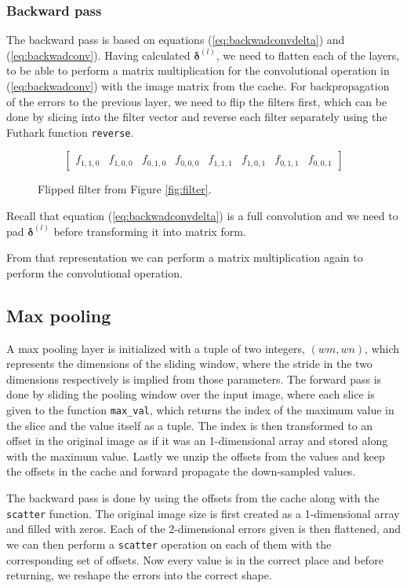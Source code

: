 \subsubsection{Backward pass}
The backward pass is based on equations (\ref{eq:backwadconvdelta}) and
(\ref{eq:backwadconv}). Having calculated $\boldsymbol{\delta}^{(l)}$, we need
to flatten each of the layers, to be able to perform a matrix multiplication for
the convolutional operation in (\ref{eq:backwadconv}) with the image matrix from
the cache.
For backpropagation of the errors to the previous layer, we need to flip the
filters first, which can be done by slicing into the filter vector and reverse
each filter separately using the Futhark function \texttt{reverse}. 
\begin{figure}[!hbtp]
	\begin{displaymath}
	\begin{bmatrix}
	f_{1,1,0} & f_{1,0,0} & f_{0,1,0} & f_{0,0,0} & f_{1,1,1} & f_{1,0,1} &
	f_{0,1,1} & f_{0,0,1}
	\end{bmatrix}
	\end{displaymath}
	\caption{Flipped filter from Figure \ref{fig:filter}.}
\end{figure} \newline 
Recall that equation (\ref{eq:backwadconvdelta}) is a full convolution and we
need to pad $\boldsymbol{\delta}^{(l)}$ before transforming it into matrix form.

From that representation we can perform a matrix multiplication again to perform
the convolutional operation.

\subsection{Max pooling}
A max pooling layer is initialized with a tuple of two integers, $(wm, wn)$,
which represents the dimensions of the sliding window, where the stride in the
two dimensions respectively is implied from those parameters. 
The forward pass is done by sliding the pooling window over the input image,
where each slice is given to the function \texttt{max\_val}, which returns the
index of the maximum value in the slice and the value itself as a tuple. 
The index is then transformed to an offset in the original image as if it was an
1-dimensional array and stored along with the maximum value. 
Lastly we unzip the offsets from the values and keep the offsets in the cache
and forward propagate the down-sampled values. 

The backward pass is done by using the offsets from the cache along with the
\texttt{scatter} function. 
The original image size is first created as a 1-dimensional array and filled
with zeros. 
Each of the 2-dimensional errors given is then flattened, and we can then
perform a \texttt{scatter} operation on each of them with the corresponding set
of offsets. 
Now every value is in the correct place and before returning, we reshape the
errors into the correct shape. 

